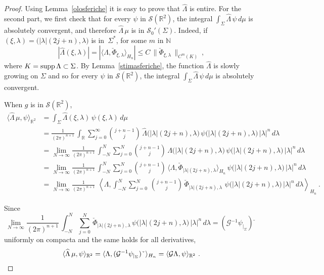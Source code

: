 \documentclass[12pt,a4paper]{amsart}
\theoremstyle{plain}
\theoremstyle{definition}
\numberwithin{equation}{section}
\begin{document}
\begin{proof} Using Lemma~\ref{olosferiche}
it is easy to prove that $\widehat \Lambda$ is entire.
For the second part, we first check that 
for every $\psi$ in ${\mathcal S}({\mathbb R}^2)$, the integral $\int_{\Sigma} \widehat \Lambda\, \psi\,d\mu$ 
is absolutely convergent, and therefore $\widehat \Lambda\,\mu$ is in ${\mathcal S}_0'({\Sigma})$.
Indeed, if $(\xi,{\lambda})=\big(|{\lambda}|(2j+{n}),{\lambda}\big)$ is in~${{\Sigma^*}}$, for some $m$ in ${\mathbb N}$
$$
|\widehat \Lambda(\xi,{\lambda})|=
|{\langle { \Lambda},{\check{\Phi}_{\xi,{\lambda}}} \rangle_{{H_{n}}}}| \le C\,\big\|
{\check\Phi_{\xi,{\lambda}}}\,\big\|_{C^m(K)}\ ,
$$
where $K={\text{\rm supp\,}} \Lambda \subset {\Sigma}$.
By Lemma~\ref{stimasferiche}, the function
 $\widehat \Lambda$ is slowly growing on $\Sigma$
and so for every $\psi $ in ${\mathcal S}({\mathbb R}^2)$, the integral $\int_{\Sigma} \widehat \Lambda\, \psi\,d\mu$ 
is absolutely convergent.

When $g$ is in ${\mathcal S}({\mathbb R}^2)$,
\begin{align*}
{\langle { \widehat \Lambda\,\mu},{\psi} \rangle_{{\mathbb R}^2}}
&=\int_{\Sigma} \widehat \Lambda(\xi,{\lambda})\, \psi(\xi,{\lambda})\,d\mu\\
&=\frac{1}{(2\pi)^{{n}+1}}\,
\int_{\mathbb R}\sum_{j=0}^\infty\binom{j+ {n}-1}j\,\widehat \Lambda\big(|{\lambda}|(2j+{n}),{\lambda}\big)
\, \psi\big(|{\lambda}|(2j+{n}),{\lambda}\big)\,|{\lambda}|^{n}\,d{\lambda}\\
&=\lim_{N\to\infty} \frac{1}{(2\pi)^{{n}+1}}\,
\int_{-N}^N
\sum_{j=0}^N \binom{j+ {n}-1}j\, \widehat \Lambda\big(|{\lambda}|(2j+{n}),{\lambda}\big)\,
\psi\big(|{\lambda}|(2j+{n}),{\lambda}\big)\,|{\lambda}|^{n}\,d{\lambda}\\
&=\lim_{N\to\infty}\frac{1}{(2\pi)^{{n}+1}}\,
\int_{-N}^N\sum_{j=0}^N  \binom{j+ {n}-1}j\,
{\langle { \Lambda},{
\check\Phi_{|{\lambda}|(2j+{n}),{\lambda}}} \rangle_{{H_{n}}}}\, \psi\big(|{\lambda}|(2j+{n}),{\lambda}\big)\,|{\lambda}|^{n}\,d{\lambda}\\
&=\lim_{N\to\infty}\frac{1}{(2\pi)^{{n}+1}}\,
\, {\left\langle { \Lambda},{\int_{-N}^N\sum_{j=0}^N \, \binom{j+ {n}-1}j\,
            \check\Phi_{|{\lambda}|(2j+{n}),{\lambda}}\,\, 
            \psi\big(|{\lambda}|(2j+{n}),{\lambda}\big)\,|{\lambda}|^{n}\,d{\lambda}} \right\rangle_{{H_{n}}}}
\ .
\end{align*}
 

Since
$$
\lim_{N\to\infty}\frac{1}{(2\pi)^{{n}+1}}\,
\int_{-N}^N\sum_{j=0}^N \, \check\Phi_{|{\lambda}|(2j+{n}),{\lambda}}\, 
\psi\big(|{\lambda}|(2j+{n}),{\lambda}\big)\,
|{\lambda}|^{n}\,d{\lambda}=({\mathcal G}{^{-1}}  \psi_{|_\Sigma})\check{\phantom a}
$$
uniformly on compacta and the same holds for all derivatives,
\[
{\langle { \widehat \Lambda\,\mu},{\psi} \rangle_{{\mathbb R}^2}}
={\langle { \Lambda},{({\mathcal G}{^{-1}} \psi_{|_\Sigma})\check{\phantom a}} \rangle_{{H_{n}}}}
={\langle {{\mathcal G} \Lambda},{\psi} \rangle_{{\mathbb R}^2}}\ .\qedhere
\]
\end{proof}
\end{document}
